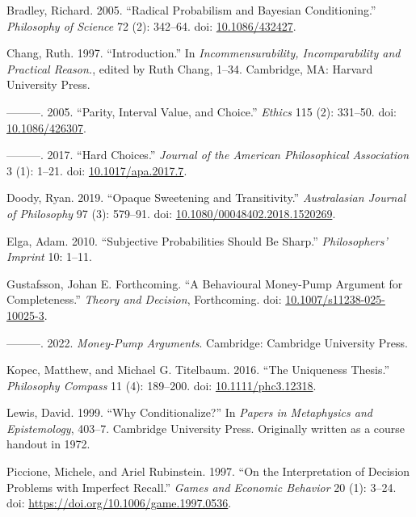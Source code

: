 \documentclass[
  11pt,
  letterpaper,
  DIV=11,
  numbers=noendperiod,
  twoside]{scrartcl}
\newlength{\cslhangindent}
\newenvironment{CSLReferences}[2] %
 {\begin{list}{}{%
  \setlength{\itemindent}{0pt}
  \setlength{\leftmargin}{0pt}
  \setlength{\parsep}{0pt}
  \ifodd #1
   \setlength{\leftmargin}{\cslhangindent}
   \setlength{\itemindent}{-1\cslhangindent}
  \fi
  \setlength{\itemsep}{#2\baselineskip}}}
 {\end{list}}
\begin{document}
\label{refs}
\begin{CSLReferences}{1}{0}
Bradley, Richard. 2005. {``Radical Probabilism and Bayesian
Conditioning.''} \emph{Philosophy of Science} 72 (2): 342--64. doi:
\href{https://doi.org/10.1086/432427}{10.1086/432427}.

Chang, Ruth. 1997. {``Introduction.''} In \emph{Incommensurability,
Incomparability and Practical Reason.}, edited by Ruth Chang, 1--34.
Cambridge, MA: Harvard University Press.

---------. 2005. {``Parity, Interval Value, and Choice.''} \emph{Ethics}
115 (2): 331--50. doi:
\href{https://doi.org/10.1086/426307}{10.1086/426307}.

---------. 2017. {``Hard Choices.''} \emph{Journal of the American
Philosophical Association} 3 (1): 1--21. doi:
\href{https://doi.org/10.1017/apa.2017.7}{10.1017/apa.2017.7}.

Doody, Ryan. 2019. {``Opaque Sweetening and Transitivity.''}
\emph{Australasian Journal of Philosophy} 97 (3): 579--91. doi:
\href{https://doi.org/10.1080/00048402.2018.1520269}{10.1080/00048402.2018.1520269}.

Elga, Adam. 2010. {``Subjective Probabilities Should Be Sharp.''}
\emph{Philosophers' Imprint} 10: 1--11.

Gustafsson, Johan E. Forthcoming. {``A Behavioural Money-Pump Argument
for Completeness.''} \emph{Theory and Decision}, Forthcoming. doi:
\href{https://doi.org/10.1007/s11238-025-10025-3}{10.1007/s11238-025-10025-3}.

---------. 2022. \emph{Money-Pump Arguments}. Cambridge: Cambridge
University Press.

Kopec, Matthew, and Michael G. Titelbaum. 2016. {``The Uniqueness
Thesis.''} \emph{Philosophy Compass} 11 (4): 189--200. doi:
\href{https://doi.org/10.1111/phc3.12318}{10.1111/phc3.12318}.

Lewis, David. 1999. {``Why Conditionalize?''} In \emph{Papers in
Metaphysics and Epistemology}, 403--7. Cambridge University Press.
Originally written as a course handout in 1972.

Piccione, Michele, and Ariel Rubinstein. 1997. {``On the Interpretation
of Decision Problems with Imperfect Recall.''} \emph{Games and Economic
Behavior} 20 (1): 3--24. doi:
\url{https://doi.org/10.1006/game.1997.0536}.


\end{CSLReferences}
\end{document}
